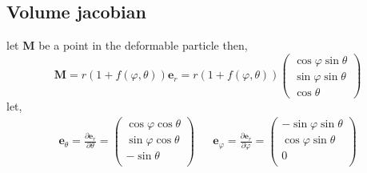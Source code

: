 \subsection{Volume jacobian}

let \textbf{M} be a point in the deformable particle then, 
\begin{equation}
    \textbf{M}
    =
    r(1+f(\varphi,\theta))\textbf{e}_r
    =
    r(1+f(\varphi,\theta))\begin{pmatrix}
        \cos\varphi \sin\theta\\
        \sin\varphi \sin\theta\\
        \cos\theta
    \end{pmatrix}
\end{equation}
let,
\begin{align}
    \textbf{e}_{\theta}
    =
    \frac{\partial \textbf{e}_r}{\partial \theta}
    = 
    \begin{pmatrix}
        \cos \varphi \cos\theta\\
        \sin \varphi \cos\theta\\
        -\sin\theta\\
    \end{pmatrix}
    &&
    \textbf{e}_{\varphi}
    =
    \frac{\partial \textbf{e}_r}{\partial \varphi}
    = 
    \begin{pmatrix}
        -\sin \varphi \sin\theta\\
        \cos \varphi \sin\theta\\
        0\\
    \end{pmatrix}\\
\end{align}

